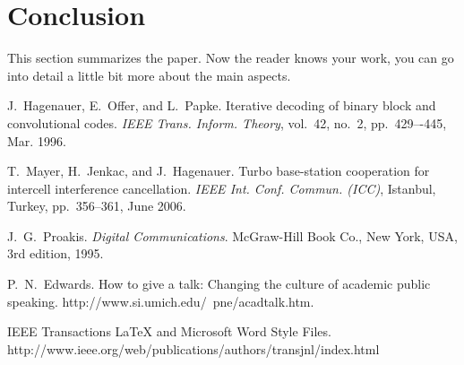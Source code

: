 \documentclass[journal, a4paper]{IEEEtran}
\begin{document}
\section{Conclusion}
This section summarizes the paper. Now the reader knows your work, you can go into detail a little bit more about the main aspects.


\begin{thebibliography}{1}

    J.~Hagenauer, E.~Offer, and L.~Papke. Iterative decoding of binary block
    and convolutional codes. {\em IEEE Trans. Inform. Theory},
    vol.~42, no.~2, pp.~429–-445, Mar. 1996.

    T.~Mayer, H.~Jenkac, and J.~Hagenauer. Turbo base-station cooperation for intercell interference cancellation. {\em IEEE Int. Conf. Commun. (ICC)}, Istanbul, Turkey, pp.~356--361, June 2006.

    J.~G.~Proakis. {\em Digital Communications}. McGraw-Hill Book Co.,
    New York, USA, 3rd edition, 1995.

    P.~N.~Edwards. How to give a talk: Changing the culture of academic public speaking.
    http://www.si.umich.edu/~pne/acadtalk.htm.

    IEEE Transactions \LaTeX{} and Microsoft Word Style Files.
    http://www.ieee.org/web/publications/authors/transjnl/index.html

\end{thebibliography}

\end{document}

